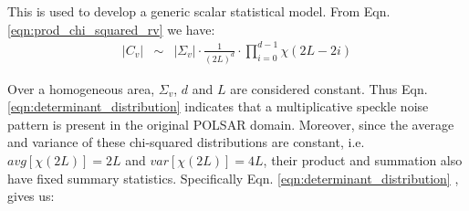 \documentclass[printer]{tRSL2e}
\begin{document}
This is used to develop a generic scalar statistical model. %
From Eqn. \ref{eqn:prod_chi_squared_rv} we have:
\vspace{-2mm}
\begin{eqnarray}
  |C_v| &\sim& |\Sigma_v| \cdot \frac{1}{(2L)^d} \cdot \prod_{i=0}^{d-1} \chi (2L-2i) \label{eqn:determinant_distribution} %
\end{eqnarray}

Over a homogeneous area, $\Sigma_v$, $d$ and $L$ are considered constant.
Thus Eqn. \ref{eqn:determinant_distribution} indicates that a multiplicative speckle noise pattern is present 
  in the original POLSAR domain.
Moreover, since the average and variance of these chi-squared distributions are %
constant, i.e. $avg \left[ \chi(2L) \right] = 2L$ and $var \left[ \chi(2L) \right] = 4L$,
  their product and summation also have fixed summary statistics.
Specifically
Eqn. \ref{eqn:determinant_distribution} %
  , gives us:
\vspace{-2mm}  
\end{document}
